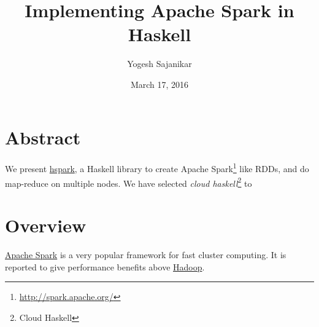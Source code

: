 \documentclass[garamond]{article}
\author{Yogesh Sajanikar}
\date{March 17, 2016}
\title{Implementing Apache Spark in Haskell}
\begin{document}
\maketitle
\setcounter{tocdepth}{2}
\tableofcontents


\section{Abstract}
\label{sec:orgheadline1}
We present \href{https://github.com/yogeshsajanikar/hspark}{hspark}, a Haskell library to create Apache Spark\footnote{\url{http://spark.apache.org/}}
like RDDs, and do map-reduce on multiple nodes. We have selected
\emph{cloud haskell}\footnote{Cloud Haskell} to 

\section{Overview}
\label{sec:orgheadline2}
\href{http://spark.apache.org/}{Apache Spark} is a very popular framework for fast cluster
computing. It is reported to give performance benefits\footnotemark[1]{} above 
\href{http://hadoop.apache.org/}{Hadoop}.  
\end{document}
